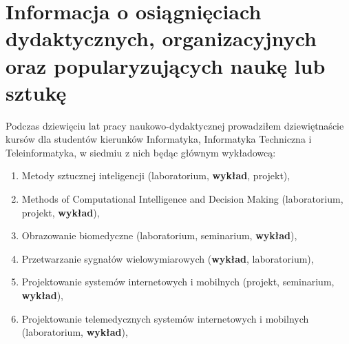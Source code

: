 
\section{Informacja o osiągnięciach dydaktycznych, organizacyjnych oraz popularyzujących naukę lub sztukę}

Podczas dziewięciu lat pracy naukowo-dydaktycznej prowadziłem dziewiętnaście kursów dla studentów kierunków Informatyka, Informatyka Techniczna i Teleinformatyka, w siedmiu z nich będąc głównym wykładowcą: 

\begin{enumerate}
	\item Metody sztucznej inteligencji (laboratorium, \textbf{wykład}, projekt),
	\item Methods of Computational Intelligence and Decision Making (laboratorium, projekt, \textbf{wykład}),
	\item Obrazowanie biomedyczne (laboratorium, seminarium, \textbf{wykład}),
	\item Przetwarzanie sygnałów wielowymiarowych (\textbf{wykład}, laboratorium),
	\item Projektowanie systemów internetowych i mobilnych (projekt, seminarium, \textbf{wykład}),
	\item Projektowanie telemedycznych systemów internetowych i mobilnych (laboratorium, \textbf{wykład}),
\end{enumerate}

